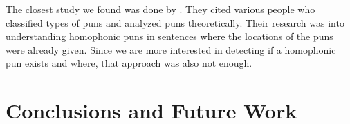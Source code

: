 \documentclass[11pt,a4paper]{article}
\begin{document}
The closest study we found was done by \citet{jaech_koncel-kedziorski_ostendorf_2016}. They cited various people who classified types of puns and analyzed puns theoretically. Their research was into understanding homophonic puns in sentences where the locations of the puns were already given. Since we are more interested in detecting if a homophonic pun exists and where, that approach was also not enough.

\section{Conclusions and Future Work}

%
%


\end{document}
